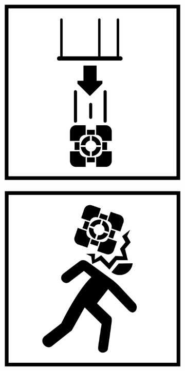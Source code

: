 \begin{figure}[H]
  \begin{subfigure}[l]{0.195\linewidth}
    \includegraphics[width=\textwidth]{Sources/PortalIcons/1.jpg}
  \end{subfigure}
  \begin{subfigure}[l]{0.195\linewidth}
    \includegraphics[width=\textwidth]{Sources/PortalIcons/2.jpg}

\end{subfigure}
\end{figure}
